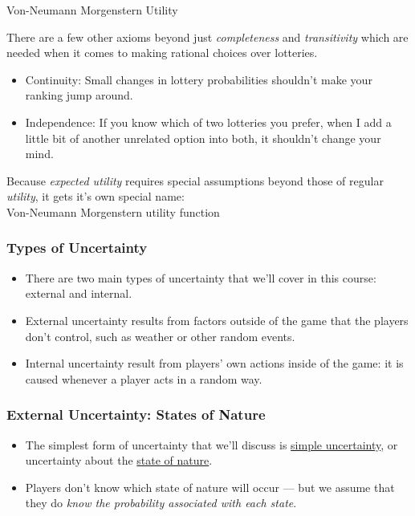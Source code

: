 \begin{frame}{Von-Neumann Morgenstern Utility}

  There are a few other axioms beyond just \textit{completeness} and \textit{transitivity}
  which are needed when it comes to making rational choices over lotteries.

  \begin{itemize}
    \item \alert{Continuity:} Small changes in lottery probabilities shouldn't make your ranking jump around.
    \item \alert{Independence:} If you know which of two lotteries you prefer, when I add a little bit of another unrelated option into both, it shouldn't change your mind.
  \end{itemize}

  Because \textit{expected utility} requires special assumptions beyond those of regular \textit{utility}, 
  it gets it's own special name: \\
  \alert{Von-Neumann Morgenstern utility function}
\end{frame}

\begin{frame}
\frametitle{Types of Uncertainty}
\begin{itemize}
	\item There are two main types of uncertainty that we'll cover in this course: \alert{external} and \alert{internal}.
  \item \alert{External uncertainty} results from factors outside of the game that the players don't control, such as weather or other random events.
  \item \alert{Internal uncertainty} result from players' own actions inside of the game: it is caused whenever a player acts in a random way.
\end{itemize}
\end{frame}


\begin{frame}
\frametitle{External Uncertainty: States of Nature}
\begin{itemize}
\item The simplest form of uncertainty that we'll discuss is \underline{simple uncertainty}, or uncertainty about the \underline{state of nature}.
\item Players don't know which state of nature will occur --- 
  but we assume that they do \textit{know the probability associated with each state}.
\end{itemize}
\end{frame}

